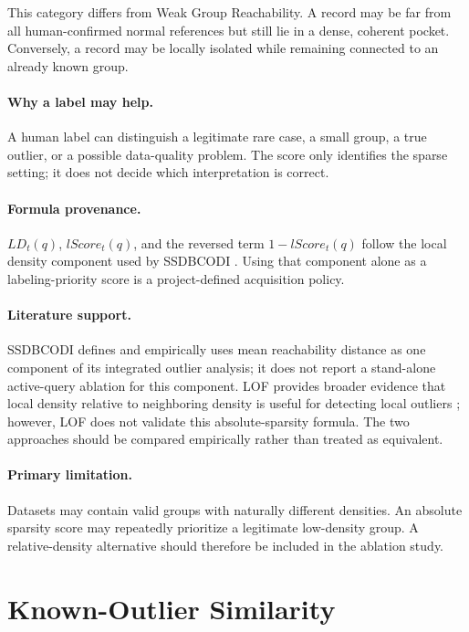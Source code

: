 \documentclass[11pt]{article}
\begin{document}
This category differs from Weak Group Reachability. A record may be far from all
human-confirmed normal references but still lie in a dense, coherent pocket.
Conversely, a record may be locally isolated while remaining connected to an
already known group.

\paragraph{Why a label may help.}
A human label can distinguish a legitimate rare case, a small group, a true
outlier, or a possible data-quality problem. The score only identifies the
sparse setting; it does not decide which interpretation is correct.

\paragraph{Formula provenance.}
$LD_t(q)$, $lScore_t(q)$, and the reversed term $1-lScore_t(q)$ follow the local
density component used by SSDBCODI \cite{deng2022ssdbcodi}. Using that component
alone as a labeling-priority score is a project-defined acquisition policy.

\paragraph{Literature support.}
SSDBCODI defines and empirically uses mean reachability distance as one
component of its integrated outlier analysis; it does not report a stand-alone
active-query ablation for this component. LOF provides broader evidence that local density
relative to neighboring density is useful for detecting local outliers
\cite{breunig2000lof}; however, LOF does not validate this absolute-sparsity
formula. The two approaches should be compared empirically rather than treated
as equivalent.

\paragraph{Primary limitation.}
Datasets may contain valid groups with naturally different densities. An
absolute sparsity score may repeatedly prioritize a legitimate low-density
group. A relative-density alternative should therefore be included in the
ablation study.

\section{Known-Outlier Similarity}
\end{document}
